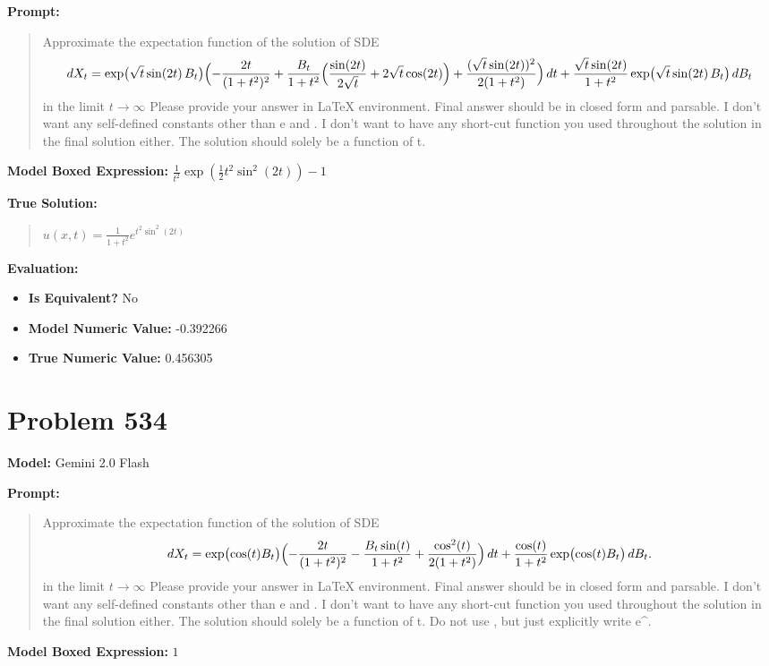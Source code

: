 \documentclass{article}
\begin{document}
\textbf{Prompt:}
\begin{quote}
Approximate the expectation function of the solution of SDE $$dX_t=\exp\bigl(\sqrt{t}\sin(2t)\,B_t\bigr)\Bigl(-\frac{2t}{(1+t^2)^2}+\frac{B_t}{1+t^2}\Bigl(\frac{\sin(2t)}{2\sqrt{t}}+2\sqrt{t}\cos(2t)\Bigr)+\frac{(\sqrt{t}\sin(2t))^2}{2(1+t^2)}\Bigr)\,dt+\frac{\sqrt{t}\sin(2t)}{1+t^2}\exp\bigl(\sqrt{t}\sin(2t)\,B_t\bigr)\,dB_t$$ in the limit $t \to \infty$ Please provide your answer in LaTeX \boxed{} environment. Final answer should be in closed form and parsable. I don't want any self-defined constants other than e and \pi. I don't want to have any short-cut function you used throughout the solution in the final solution either. The solution should solely be a function of t.
\end{quote}
\textbf{Model Boxed Expression:} $\frac{1}{t^2}\exp\left(\frac{1}{2}t^2\sin^2(2t)\right)-1$

\textbf{True Solution:}
\begin{quote}
$u(x,t) = \frac{1}{1 + t^2} e^{t^2 \sin^2(2t)}$
\end{quote}

\textbf{Evaluation:}
\begin{itemize}
\item \textbf{Is Equivalent?} No
\item \textbf{Model Numeric Value:} -0.392266
\item \textbf{True Numeric Value:} 0.456305
\end{itemize}
\vspace{1cm}
\section*{Problem 534}
\textbf{Model:} Gemini 2.0 Flash

\textbf{Prompt:}
\begin{quote}
Approximate the expectation function of the solution of SDE $$dX_t=\exp\bigl(\cos(t)B_t\bigr)\Bigl(-\frac{2t}{(1+t^2)^2}-\frac{B_t\sin(t)}{1+t^2}+\frac{\cos^2(t)}{2(1+t^2)}\Bigr)\,dt+\frac{\cos(t)}{1+t^2}\exp\bigl(\cos(t)B_t\bigr)\,dB_t.$$ in the limit $t \to \infty$ Please provide your answer in LaTeX \boxed{} environment. Final answer should be in closed form and parsable. I don't want any self-defined constants other than e and \pi. I don't want to have any short-cut function you used throughout the solution in the final solution either. The solution should solely be a function of t. Do not use \exp, but just explicitly write e^.
\end{quote}
\textbf{Model Boxed Expression:} $1$
\end{document}
